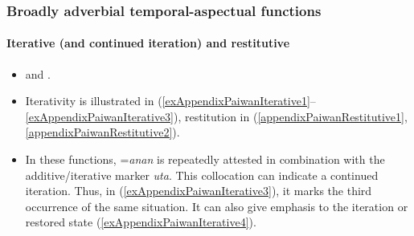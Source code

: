 \subsubsection{Broadly adverbial temporal-aspectual functions}

\paragraph{Iterative (and continued iteration) and restitutive}
\label{appendixPaiwanIterative}
\begin{itemize}
	\item \textcite[228, 295]{Chang2006} and \textcite[29, 613]{Egli2002}.
	\item Iterativity is illustrated in (\ref{exAppendixPaiwanIterative1}–\ref{exAppendixPaiwanIterative3}), restitution in (\ref{appendixPaiwanRestitutive1}, \ref{appendixPaiwanRestitutive2}).
	\item In these functions, \mbox{=\textit{anan}} is repeatedly attested in combination with the additive/iterative marker \textit{uta}. This collocation can indicate a continued iteration. Thus, in (\ref{exAppendixPaiwanIterative3}), it marks the third occurrence of the same situation. It can also give emphasis to the iteration or restored state (\ref{exAppendixPaiwanIterative4}).
\end{itemize}
\pagebreak
